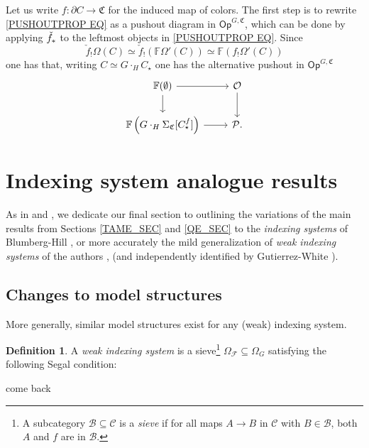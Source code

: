 \documentclass[a4paper,10pt
,draft
]{article}%
\numberwithin{equation}{section}
\numberwithin{figure}{section}
\theoremstyle{definition} %
\newtheorem{definition}[equation]{Definition}%
\newcommand{\F}{\ensuremath{\mathcal F}}
\newcommand{\1}{\ensuremath{\mathbbm 1}}%
\begin{document}
Let us write $f \colon \partial C \to \mathfrak{C}$
for the induced map of colors.
The first step is to rewrite \eqref{PUSHOUTPROP EQ} as a pushout diagram in $\mathsf{Op}^{G,\mathfrak{C}}$, which can be done by applying $\check{f}_{\**}$
to the leftmost objects in \eqref{PUSHOUTPROP EQ}.
Since
\[
\check{f}_{!} \Omega(C) \simeq 
\check{f}_{!} \left( \mathbb{F} \Omega'(C) \right) \simeq 
\mathbb{F} \left(f_{!}  \Omega'(C) \right)
\]
one has that, writing $C \simeq G \cdot_H C_{\star}$ one has the alternative pushout in $\mathsf{Op}^{G,\mathfrak{C}}$
\begin{equation}
\begin{tikzcd}
\mathbb{F} ( \emptyset ) \ar{r} \ar{d} & \mathcal{O} \ar{d}
\\
\mathbb{F} \left( 
G \cdot_H \Sigma_{\mathfrak{C}}[C^f_{\star}] \right) \ar{r} & \mathcal{P}.
\end{tikzcd}
\end{equation}












\section{Indexing system analogue results}\label{INDSYS SEC}

As in \cite[\S 6]{BP_edss} and \cite[\S 9]{Per18}, we dedicate our final section to 
outlining the variations of the main results from Sections \ref{TAME_SEC} and \ref{QE_SEC} to
the \textit{indexing systems} of Blumberg-Hill \cite{BH15}, or more accurately
the mild generalization of \textit{weak indexing systems} of the authors \cite[\S 9]{Per18}, \cite[\S4.4]{BP_geo} (and independently identified by Gutierrez-White \cite{GW18}).


\subsection{Changes to model structures}
More generally, similar model structures exist for any (weak) indexing system.
\begin{definition}
      A \textit{weak indexing system} is a sieve\footnote{
        A subcategory $\mathcal B \subseteq \mathcal C$ is a \textit{sieve} if for all maps $A \to B$ in $\mathcal C$
        with $B \in \mathcal B$, both $A$ and $f$ are in $\mathcal B$.}
      $\Omega_\F \subseteq \Omega_G$
      satisfying the following Segal condition:

      come back
\end{definition}
\end{document}
